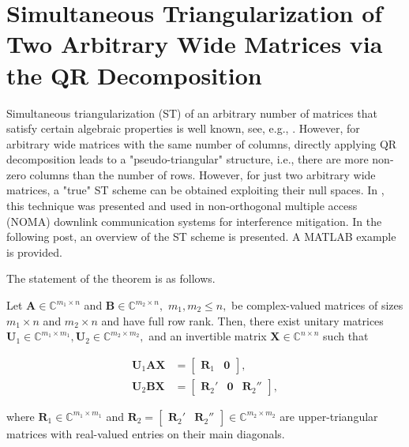 \section{Simultaneous Triangularization of Two Arbitrary Wide Matrices via the QR Decomposition}

Simultaneous triangularization (ST) of an arbitrary number of matrices that satisfy certain algebraic properties is well known, see, e.g., \cite{Radjavi2012}. However, for arbitrary wide matrices with the same number of columns, directly applying QR decomposition leads to a "pseudo-triangular" structure, i.e., there are more non-zero columns than the number of rows. However, for just two arbitrary wide matrices, a "true" ST scheme can be obtained exploiting their null spaces. In \cite{Krishnamoorthy2021}, this technique was presented and used in non-orthogonal multiple access (NOMA) downlink communication systems for interference mitigation. In the following post, an overview of the ST scheme is presented. A MATLAB example is provided.

The statement of the theorem is as follows.

\begin{theorem}
Let $\boldsymbol{A} \in \mathbb{C}^{m_1\times n}$ and $\boldsymbol{B} \in \mathbb{C}^{m_2\times n},$ $m_1,m_2 \leq n,$ be complex-valued matrices of sizes $m_1\times n$ and $m_2\times n$ and have full row rank. Then, there exist unitary matrices $\boldsymbol{U}_1 \in \mathbb{C}^{m_1\times m_1}, \boldsymbol{U}_2 \in \mathbb{C}^{m_2\times m_2},$ and an invertible matrix $\boldsymbol{X} \in \mathbb{C}^{n\times n}$ such that

\begin{align}\boldsymbol{U}_1\boldsymbol{A}\boldsymbol{X} &= \begin{bmatrix}\boldsymbol{R}_1 & \boldsymbol{0}\end{bmatrix}, \label{eqn:std1}\\\boldsymbol{U}_2\boldsymbol{B}\boldsymbol{X} &= \begin{bmatrix}\boldsymbol{R}_2' & \boldsymbol{0} & \boldsymbol{R}_2''\end{bmatrix}, \label{eqn:std2}\end{align}

where $\boldsymbol{R}_1 \in \mathbb{C}^{m_1\times m_1}$ and $\boldsymbol{R}_2 = \begin{bmatrix}\boldsymbol{R}_2'& \boldsymbol{R}_2''\end{bmatrix} \in \mathbb{C}^{m_2\times m_2}$ are upper-triangular matrices with real-valued entries on their main diagonals.
\end{theorem}

